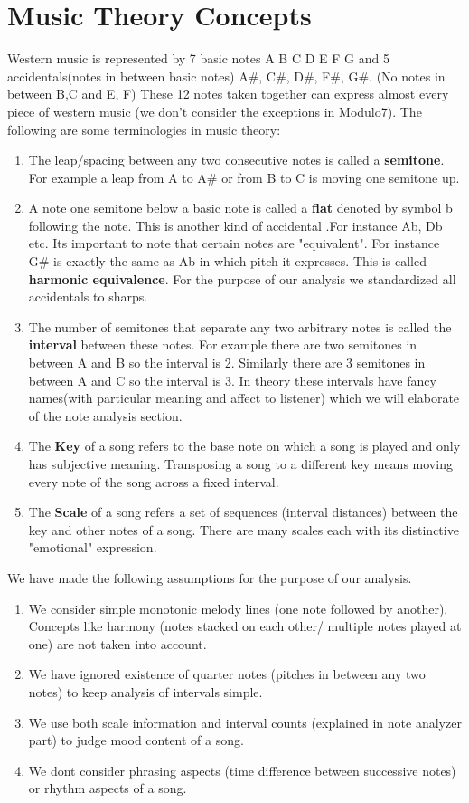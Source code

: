 \documentclass[letterpaper, 11pt]{article}
\begin{document}
\section*{Music Theory Concepts}
Western music is represented by 7 basic notes A B C D E F G and 5 accidentals(notes in between basic notes) A\#, C\#, D\#, F\#, G\#. (No notes in between B,C and E, F) These 12 notes taken together can express almost every piece of western music (we don't consider the exceptions in Modulo7). The following are some terminologies in music theory:
\begin{enumerate}
\item The leap/spacing between any two consecutive notes is called a \textbf{semitone}. For example a leap from A to A\# or from B to C is moving one semitone up. 
\item A note one semitone below a basic note is called a \textbf{flat} denoted by symbol b following the note. This is another kind of accidental .For instance Ab, Db etc. Its important to note that certain notes are "equivalent". For instance G\# is exactly the same as Ab in which pitch it expresses. This is called \textbf{harmonic equivalence}. For the purpose of our analysis we standardized all accidentals to sharps. 
\item The number of semitones that separate any two arbitrary notes is called the \textbf{interval} between these notes. For example there are two semitones in between A and B so the interval is 2. Similarly there are 3 semitones in between A and C so the interval is 3. In theory these intervals have fancy names(with particular meaning and affect to listener) which we will elaborate of the note analysis section.
\item The \textbf{Key} of a song refers to the base note on which a song is played and only has subjective meaning. Transposing a song to a different key means moving every note of the song across a fixed interval.
\item The \textbf{Scale} of a song refers a set of sequences (interval distances) between the key and other notes of a song. There are many scales each with its distinctive "emotional" expression.
\end{enumerate} 

We have made the following assumptions for the purpose of our analysis.
\begin{enumerate}
\item We consider simple monotonic melody lines (one note followed by another). Concepts like harmony (notes stacked on each other/ multiple notes played at one) are not taken into account.
\item We have ignored existence of quarter notes (pitches in between any two notes) to keep analysis of intervals simple.
\item We use both scale information and interval counts (explained in note analyzer part) to judge mood content of a song.
\item We dont consider phrasing aspects (time difference between successive notes) or rhythm aspects of a song.
\end{enumerate}
\end{document}
